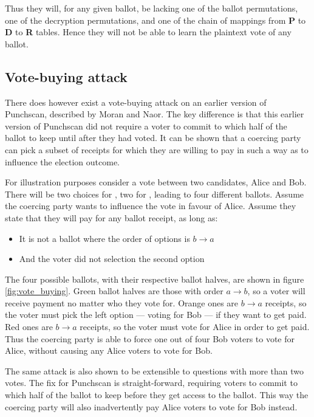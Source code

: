 Thus they will, for any given ballot, be lacking one of the ballot
permutations, one of the decryption permutations, and one of the chain of
mappings from \textbf{P} to \textbf{D} to \textbf{R} tables. Hence they will not be
able to learn the plaintext vote of any ballot.

\subsection{Vote-buying attack}

There does however exist a vote-buying attack on an earlier version of
Punchscan, described by Moran and
Naor\autocite{moranSplitballotVotingEverlasting2010}. The key difference is
that this earlier version of Punchscan did not require a voter to commit to
which half of the ballot to keep until after they had voted. It can be shown
that a coercing party can pick a subset of receipts for which they are willing
to pay in such a way as to influence the election outcome.

For illustration purposes consider a vote between two candidates, Alice and
Bob. There will be two choices for \ptop{}, two for \pbottom{}, leading to four
different ballots. Assume the coercing party wants to influence the vote in
favour of Alice. Assume they state that they will pay for any ballot receipt,
as long as:
\begin{itemize}
\item It is not a ballot where the order of options is $b \rightarrow a$
\item And the voter did not selection the second option
\end{itemize}

The four possible ballots, with their respective ballot halves, are shown in
figure \ref{fig:vote_buying}. Green ballot halves are those with order $a
\rightarrow b$, so a voter will receive payment no matter who they vote for.
Orange ones are $b \rightarrow a$ receipts, so the voter must pick the left
option --- voting for Bob --- if they want to get paid. Red ones are $b
\rightarrow a$ receipts, so the voter must vote for Alice in order to get paid.
Thus the coercing party is able to force one out of four Bob voters to vote for
Alice, without causing any Alice voters to vote for Bob.

The same attack is also shown to be extensible to questions with more than two
votes. The fix for Punchscan is straight-forward, requiring voters to commit to
which half of the ballot to keep before they get access to the ballot. This way
the coercing party will also inadvertently pay Alice voters to vote for Bob
instead.

